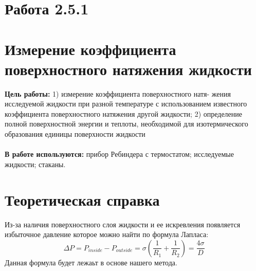 \documentclass[12 pt, a4paper]{article}%
\begin{document}

\begin{center}
\section*{Работа 2.5.1}
\section*{Измерение коэффициента поверхностного натяжения жидкости}
\end{center}
\textbf{Цель работы:} 1) измерение коэффициента поверхностного натя- жения исследуемой жидкости при разной температуре с использованием известного коэффициента поверхностного натяжения другой жидкости; 2) определение полной поверхностной энергии и теплоты, необходимой для изотермического образования единицы поверхности жидкости \\ \\
\textbf{В работе используются:} прибор Ребиндера с термостатом; исследуемые жидкости; стаканы.

\section*{Теоретическая справка}
Из-за наличия поверхностного слоя жидкости и ее искревления появляется избыточное давление которое можно найти по формула Лапласа: $$\Delta P = P_{inside} - P_{outside} = \sigma(\frac{1}{R_1} + \frac{1}{R_2}) = \frac{4\sigma}{D}$$ 
Данная формула будет лежаьт в основе нашего метода.
\end{document}
